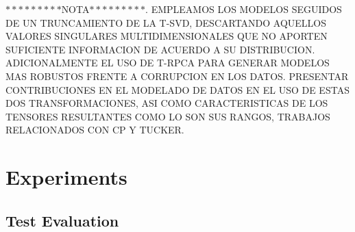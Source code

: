 \documentclass[sensors,article,submit,moreauthors,pdftex]{Definitions/mdpi}
\newcommand{\mathmat}[1]{\boldsymbol{\mathbf{\MakeUppercase{#1}}}}
\begin{document}






$*********$NOTA$*********$. EMPLEAMOS LOS MODELOS SEGUIDOS DE UN TRUNCAMIENTO DE LA T-SVD, DESCARTANDO AQUELLOS VALORES SINGULARES MULTIDIMENSIONALES QUE NO APORTEN SUFICIENTE INFORMACION DE ACUERDO A SU DISTRIBUCION. ADICIONALMENTE EL USO DE T-RPCA PARA GENERAR MODELOS MAS ROBUSTOS FRENTE A CORRUPCION EN LOS DATOS.
PRESENTAR CONTRIBUCIONES EN EL MODELADO DE DATOS EN EL USO DE ESTAS DOS TRANSFORMACIONES, ASI COMO CARACTERISTICAS DE LOS TENSORES RESULTANTES COMO LO SON SUS RANGOS, TRABAJOS RELACIONADOS CON CP Y TUCKER.






\section{Experiments}
\subsection{Test Evaluation}
\end{document}
